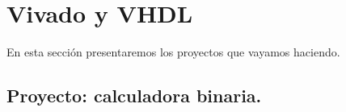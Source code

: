 \chapter{Vivado y VHDL}

En esta sección presentaremos los proyectos que vayamos haciendo. 

\section{Proyecto: calculadora binaria.}


